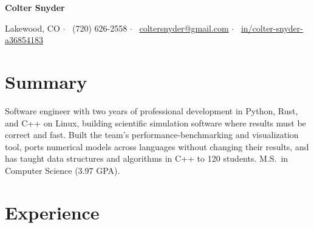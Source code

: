 \documentclass[letterpaper,10pt]{article}
\begin{document}
\begin{center}
  {\Huge\bfseries Colter Snyder}\par\vspace{4pt}
  \small
  Lakewood, CO \enspace$\cdot$\enspace
  \faPhone*\ (720) 626-2558 \enspace$\cdot$\enspace
  \faEnvelope\ \href{mailto:coltersnyder@gmail.com}{coltersnyder@gmail.com} \enspace$\cdot$\enspace
  \faLinkedin\ \href{https://www.linkedin.com/in/colter-snyder-a36854183/}{in/colter-snyder-a36854183}
\end{center}

\section{Summary}
Software engineer with two years of professional development in Python, Rust, and C++ on Linux, building
scientific simulation software where results must be correct and fast. Built the team's performance-benchmarking
and visualization tool, ports numerical models across languages without changing their results, and has taught
data structures and algorithms in C++ to 120 students. M.S.\ in Computer Science (3.97 GPA).

\section{Experience}
\end{document}
